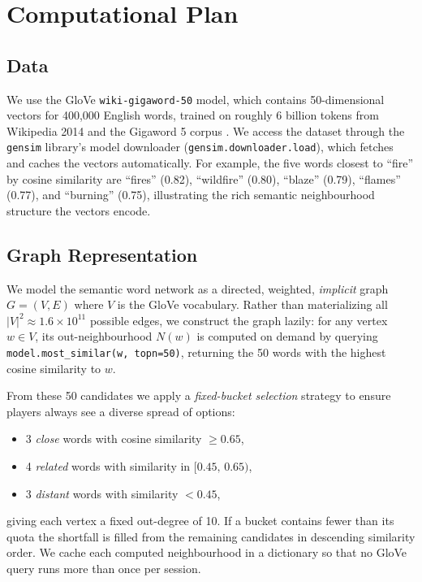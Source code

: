 \documentclass[11pt]{article}
\begin{document}
\section{Computational Plan}

\subsection*{Data}

We use the GloVe \texttt{wiki-gigaword-50} model, which contains
50-dimensional vectors for 400,000 English words, trained on roughly 6 billion
tokens from Wikipedia 2014 and the Gigaword 5 corpus \cite{glove}.
We access the dataset through the \texttt{gensim} library's model downloader
(\texttt{gensim.downloader.load}), which fetches and caches the vectors
automatically. For example, the five words closest to ``fire'' by
cosine similarity are ``fires'' (0.82), ``wildfire'' (0.80), ``blaze'' (0.79),
``flames'' (0.77), and ``burning'' (0.75), illustrating the rich semantic
neighbourhood structure the vectors encode.

\subsection*{Graph Representation}

We model the semantic word network as a directed, weighted, \emph{implicit}
graph $G = (V, E)$ where $V$ is the GloVe vocabulary.  Rather than
materializing all $|V|^2 \approx 1.6 \times 10^{11}$ possible edges, we
construct the graph lazily: for any vertex $w \in V$, its out-neighbourhood
$N(w)$ is computed on demand by querying
\texttt{model.most\_similar(w, topn=50)}, returning the 50 words with the
highest cosine similarity to $w$.

From these 50 candidates we apply a \emph{fixed-bucket selection} strategy to
ensure players always see a diverse spread of options:
\begin{itemize}
    \item 3 \emph{close} words with cosine similarity $\geq 0.65$,
    \item 4 \emph{related} words with similarity in $[0.45,\,0.65)$,
    \item 3 \emph{distant} words with similarity $< 0.45$,
\end{itemize}
giving each vertex a fixed out-degree of 10.  If a bucket contains
fewer than its quota the shortfall is filled from the remaining candidates in
descending similarity order.  We cache each computed neighbourhood in a
dictionary so that no GloVe query runs more than once per session.
\end{document}
